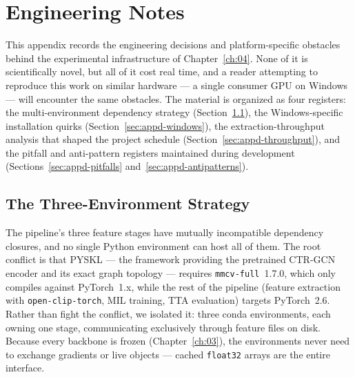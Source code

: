 \chapter{Engineering Notes}
\label{app:d}

This appendix records the engineering decisions and platform-specific obstacles
behind the experimental infrastructure of Chapter~\ref{ch:04}. None of it is
scientifically novel, but all of it cost real time, and a reader attempting to
reproduce this work on similar hardware --- a single consumer GPU on Windows ---
will encounter the same obstacles. The material is organized as four registers:
the multi-environment dependency strategy (Section~\ref{sec:appd-envs}), the
Windows-specific installation quirks (Section~\ref{sec:appd-windows}), the
extraction-throughput analysis that shaped the project schedule
(Section~\ref{sec:appd-throughput}), and the pitfall and anti-pattern registers
maintained during development (Sections~\ref{sec:appd-pitfalls}
and~\ref{sec:appd-antipatterns}).

\section{The Three-Environment Strategy}
\label{sec:appd-envs}

The pipeline's three feature stages have mutually incompatible dependency
closures, and no single Python environment can host all of them. The root
conflict is that PYSKL --- the framework providing the pretrained CTR-GCN
encoder and its exact graph topology --- requires \texttt{mmcv-full}~1.7.0,
which only compiles against PyTorch~1.x, while the rest of the pipeline
(feature extraction with \texttt{open-clip-torch}, MIL training, TTA
evaluation) targets PyTorch~2.6. Rather than fight the conflict, we isolated
it: three conda environments, each owning one stage, communicating exclusively
through feature files on disk. Because every backbone is frozen
(Chapter~\ref{ch:03}), the environments never need to exchange gradients or
live objects --- cached \texttt{float32} arrays are the entire interface.

